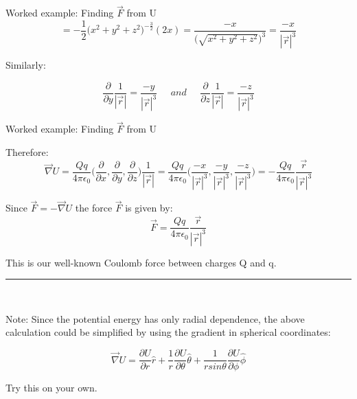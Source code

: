 {\begin{frame}{Worked example: Finding $\vec{F}$ from U}
\begin{equation*}
   = -\frac{1}{2} \Big( x^2 + y^2 + z^2 \Big) ^{-\frac{3}{2}} (2x) =
   \frac{-x}{\Big( \sqrt{x^2 + y^2 + z^2} \Big)^{3}} =
   \frac{-x}{|\vec{r}|^3}
\end{equation*}

Similarly:

\begin{equation*}
  \frac{\partial}{\partial y} \frac{1}{|\vec{r}|} = \frac{-y}{|\vec{r}|^3}
  \;\;\;\;\; and \;\;\;\;\;
  \frac{\partial}{\partial z} \frac{1}{|\vec{r}|} = \frac{-z}{|\vec{r}|^3}
\end{equation*}

\end{frame}

%
%
%

\begin{frame}{Worked example: Finding $\vec{F}$ from U}

Therefore:
\begin{equation*}
  \vec{\nabla}U =
     \frac{Qq}{4 \pi \epsilon_0}
     \Big(
       \frac{\partial}{\partial x},
       \frac{\partial}{\partial y},
       \frac{\partial}{\partial z}
     \Big) \frac{1}{|\vec{r}|} =
     \frac{Qq}{4 \pi \epsilon_0}
     \Big(
       \frac{-x}{|\vec{r}|^3},
       \frac{-y}{|\vec{r}|^3},
       \frac{-z}{|\vec{r}|^3}
     \Big) =
     - \frac{Qq}{4 \pi \epsilon_0} \frac{\vec{r}}{|\vec{r}|^3}
\end{equation*}

Since $\vec{F} = -\vec{\nabla}U$
the force $\vec{F}$ is given by:
\begin{equation*}
  \vec{F} = \frac{Qq}{4 \pi \epsilon_0} \frac{\vec{r}}{|\vec{r}|^3}
\end{equation*}

This is our well-known Coulomb force between charges Q and q.\\
\vspace{0.1cm}

\noindent\rule{2cm}{0.4pt}\\
{\scriptsize
Note: Since the potential energy has only radial dependence,
the above calculation could be simplified by using the gradient in spherical coordinates:

\begin{equation*}
  \vec{\nabla}U =
     \frac{\partial U}{\partial r} \hat{r} +
     \frac{1}{r} \frac{\partial U}{\partial \theta} \hat{\theta} +
     \frac{1}{r sin\theta} \frac{\partial U}{\partial \phi} \hat{\phi}
\end{equation*}

Try this on your own.
}

\end{frame}

} %


